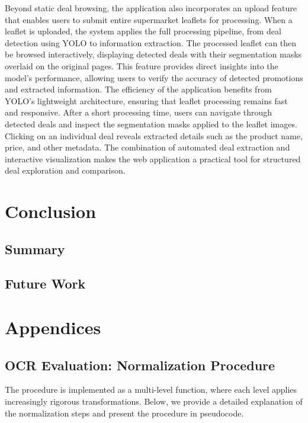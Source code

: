 \documentclass[11pt]{article}
\begin{document}
Beyond static deal browsing, the application also incorporates an upload feature that enables users to submit entire supermarket leaflets for processing. When a leaflet is uploaded, the system applies the full processing pipeline, from deal detection using YOLO to information extraction. The processed leaflet can then be browsed interactively, displaying detected deals with their segmentation masks overlaid on the original pages. This feature provides direct insights into the model’s performance, allowing users to verify the accuracy of detected promotions and extracted information. The efficiency of the application benefits from YOLO’s lightweight architecture, ensuring that leaflet processing remains fast and responsive. After a short processing time, users can navigate through detected deals and inspect the segmentation masks applied to the leaflet images. Clicking on an individual deal reveals extracted details such as the product name, price, and other metadata. The combination of automated deal extraction and interactive visualization makes the web application a practical tool for structured deal exploration and comparison.

\section{Conclusion}
    \subsection{Summary}
    \subsection{Future Work}





\appendix
\section{Appendices}
\subsection{OCR Evaluation: Normalization Procedure}
\label{app:ocr_normalization}
The procedure is implemented as a multi-level function, where each level applies increasingly rigorous transformations. Below, we provide a detailed explanation of the normalization steps and present the procedure in pseudocode.
\end{document}
